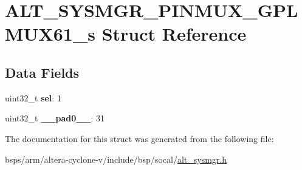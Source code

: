 \hypertarget{structALT__SYSMGR__PINMUX__GPLMUX61__s}{}\section{A\+L\+T\+\_\+\+S\+Y\+S\+M\+G\+R\+\_\+\+P\+I\+N\+M\+U\+X\+\_\+\+G\+P\+L\+M\+U\+X61\+\_\+s Struct Reference}
\label{structALT__SYSMGR__PINMUX__GPLMUX61__s}
\subsection*{Data Fields}
\begin{DoxyCompactItemize}
\item 
\mbox{\label{structALT__SYSMGR__PINMUX__GPLMUX61__s_a8c9332e9ab2c4cb086ba513fb505e483}} 
uint32\+\_\+t {\bfseries sel}\+: 1
\item 
\mbox{\label{structALT__SYSMGR__PINMUX__GPLMUX61__s_a8e146900d25cc88fc9224b7cd038e4fa}} 
uint32\+\_\+t {\bfseries \+\_\+\+\_\+pad0\+\_\+\+\_\+}\+: 31
\end{DoxyCompactItemize}


The documentation for this struct was generated from the following file\+:\begin{DoxyCompactItemize}
\item 
bsps/arm/altera-\/cyclone-\/v/include/bsp/socal/\mbox{\hyperlink{alt__sysmgr_8h}{alt\+\_\+sysmgr.\+h}}\end{DoxyCompactItemize}
